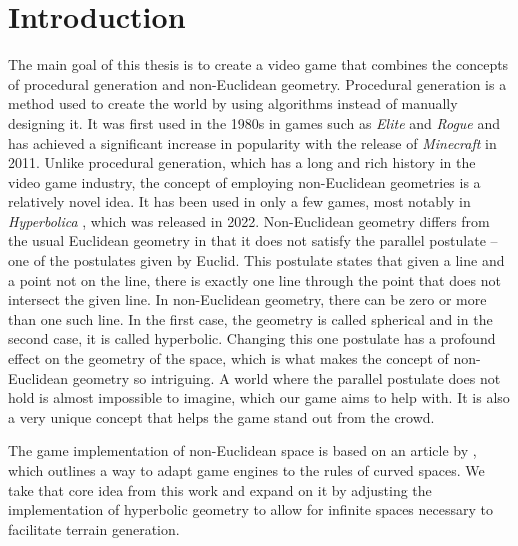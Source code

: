 \chapter{Introduction}\label{ch:introduction}


The main goal of this thesis is to create a video game that combines the concepts of procedural generation and non-Euclidean geometry.
Procedural generation is a method used to create the world by using algorithms instead of manually designing it.
It was first used in the 1980s in games such as \textit{Elite} \cite{Elite1984} and \textit{Rogue} \cite{Rogue1980} and has achieved a significant increase in popularity with the release of \textit{Minecraft} \cite{Minecraft} in 2011.
Unlike procedural generation, which has a long and rich history in the video game industry, the concept of employing non-Euclidean geometries is a relatively novel idea.
It has been used in only a few games, most notably in \textit{Hyperbolica} \cite{Hyperbolica}, which was released in 2022.
Non-Euclidean geometry differs from the usual Euclidean geometry in that it does not satisfy the parallel postulate -- one of the postulates given by Euclid.
This postulate states that given a line and a point not on the line, there is exactly one line through the point that does not intersect the given line.
In non-Euclidean geometry, there can be zero or more than one such line.
In the first case, the geometry is called spherical and in the second case, it is called hyperbolic.
Changing this one postulate has a profound effect on the geometry of the space, which is what makes the concept of non-Euclidean geometry so intriguing.
A world where the parallel postulate does not hold is almost impossible to imagine, which our game aims to help with.
It is also a very unique concept that helps the game stand out from the crowd.

The game implementation of non-Euclidean space is based on an article by \citeauthor{Szirmay-Kalos2022} \cite{Szirmay-Kalos2022}, which outlines a way to adapt game engines to the rules of curved spaces.
We take that core idea from this work and expand on it by adjusting the implementation of hyperbolic geometry to allow for infinite spaces necessary to facilitate terrain generation.

